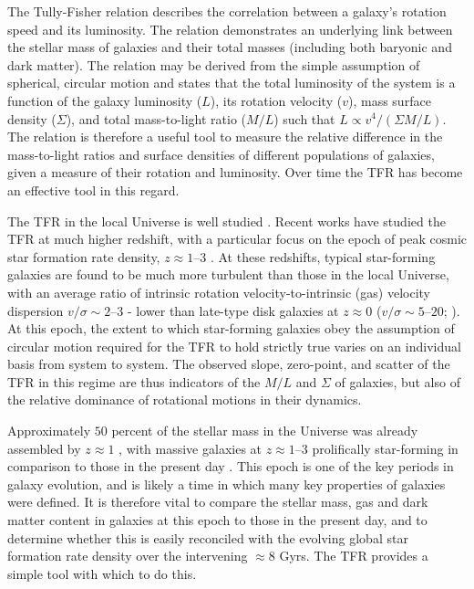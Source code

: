 \documentclass[a4paper,fleqn,usenatbib]{mnras}
\begin{document}
The Tully-Fisher relation \citep[TFR;][]{Tully:1977aa} describes the correlation between a galaxy's rotation speed and its luminosity. The relation demonstrates an underlying link between the stellar mass of galaxies and their total masses (including both baryonic and dark matter). The relation may be derived from the simple assumption of spherical, circular motion and states that the total luminosity of the system is a function of the galaxy luminosity ($L$), its rotation velocity ($v$), mass surface density ($\Sigma$), and total mass-to-light ratio ($M/L$) such that $L\propto v^{4}/(\Sigma M/L)$. The relation is therefore a useful tool to measure the relative difference in the mass-to-light ratios and surface densities of different populations of galaxies, given a measure of their rotation and luminosity. Over time the TFR has become an effective tool in this regard. 

The TFR in the local Universe is well studied \citep[e.g.][]{TullyPierce2000,Bell:2001aa,Masters:2008aa,Lagattuta:2013aa}. Recent works have studied the TFR at much higher redshift, with a particular focus on the epoch of peak cosmic star formation rate density, $z\approx1$--$3$ \citep[e.g][]{Lilly:1996,Madau:1996,Hopkins:2006,Sobral:2013a,Madau:2014}. At these redshifts, typical star-forming galaxies are found to be much more turbulent than those in the local Universe, with an average ratio of intrinsic rotation velocity-to-intrinsic (gas) velocity dispersion $v/\sigma\sim2$--$3$ \citep[e.g.][]{Stott:2016,Johnson:2018} - lower than late-type disk galaxies at $z\approx0$ ($v/\sigma\sim5$--$20$; \citealt{Epinat:2010}). At this epoch, the extent to which star-forming galaxies obey the assumption of circular motion required for the TFR to hold strictly true varies on an individual basis from system to system. The observed slope, zero-point, and scatter of the TFR in this regime are thus indicators of the $M/L$ and $\Sigma$ of galaxies, but also of the relative dominance of rotational motions in their dynamics.

Approximately $50$ percent of the stellar mass in the Universe was already assembled by $z\approx1$ \citep[e.g.][]{PerezGonzalez:2008}, with massive galaxies at $z\approx1$--$3$ prolifically star-forming in comparison to those in the present day \citep{Smit:2012}. This epoch is one of the key periods in galaxy evolution, and is likely a time in which many key properties of galaxies were defined. It is therefore vital to compare the stellar mass, gas and dark matter content in galaxies at this epoch to those in the present day, and to determine whether this is easily reconciled with the evolving global star formation rate density over the intervening $\approx$8 Gyrs. The TFR provides a simple tool with which to do this.
\end{document}
